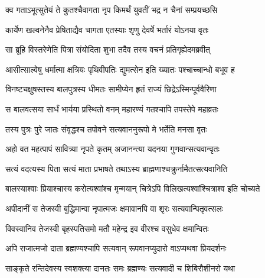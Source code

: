 \begin{center}
\twolineshloka
{क्व गताऽभूत्सुतेयं ते कुतश्चैवागता नृप}
{किमर्थं युवतीं भद्र न चैनां सम्प्रयच्छसि}




\twolineshloka
{कार्येण खल्वनेनैव प्रेषिताद्यैव चागता}
{एतस्याः शृणु देवर्षे भर्तारं योऽनया वृतः}




\twolineshloka
{सा ब्रूहि विस्तरेणेति पित्रा संयोदिता शुभा}
{तदैव तस्य वचनं प्रतिगृह्येदमब्रवीत्}


\twolineshloka
{आसीत्साल्वेषु धर्मात्मा क्षत्रियः पृथिवीपतिः}
{द्युमत्सेन इति ख्यातः पश्चाच्चान्धो बभूव ह}


\twolineshloka
{विनष्टचक्षुषस्तस्य बालपुत्रस्य धीमतः}
{सामीप्येन हृतं राज्यं छिद्रेऽस्मिन्पूर्ववैरिणा}


\twolineshloka
{स बालवत्सया सार्धं भार्यया प्रस्थितो वनम्}
{महारण्यं गतश्चापि तपस्तेपे महाव्रतः}


\twolineshloka
{तस्य पुत्रः पुरे जातः संवृद्धश्च तपोवने}
{सत्यवाननुरूपो मे भर्तेति मनसा वृतः}




\twolineshloka
{अहो वत महत्पापं सावित्र्या नृपते कृतम्}
{अजानन्त्या यदनया गुणवान्सत्यवान्वृतः}


\twolineshloka
{सत्यं वदत्यस्य पिता सत्यं माता प्रभाषते}
{तथाऽस्य ब्राह्मणाश्चक्रुर्नामैतत्सत्यवानिति}


\twolineshloka
{बालस्याश्वाः प्रियाश्चास्य करोत्यश्वांश्च मृन्मयान्}
{चित्रेऽपि विलिखत्यश्वांश्चित्राश्व इति चोच्यते}




\twolineshloka
{अपीदानीं स तेजस्वी बुद्धिमान्वा नृपात्मजः}
{क्षमावानपि वा शृरः सत्यवान्पितृवत्सलः}




\twolineshloka
{विवस्वानिव तेजस्वी बृहस्पतिसमो मतौ}
{महेन्द्र इव वीरश्च वसुधेव क्षमान्वितः}




\twolineshloka
{अपि राजात्मजो दाता ब्रह्मण्यश्चापि सत्यवान्}
{रूपवानप्युदारो वाऽप्यथवा प्रियदर्शनः}




\twolineshloka
{साङ्कृते रन्तिदेवस्य स्वशक्त्या दानतः समः}
{ब्रह्मण्यः सत्यवादी च शिबिरौशीनरो यथा}



\end{center}
